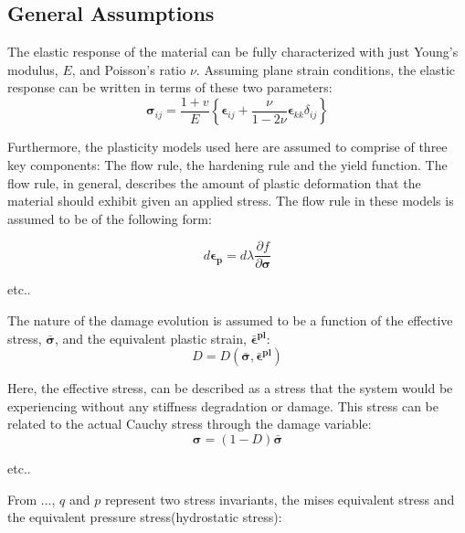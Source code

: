\subsection{General Assumptions}
The elastic response of the material can be fully characterized with just Young's modulus, $E$, and Poisson's ratio $\nu$. Assuming plane strain conditions, the elastic response can be written in terms of these two parameters:
\begin{equation}
\boldsymbol{\sigma}_{ij}=\frac{1+v}{E}\left\{\boldsymbol{\epsilon}_{ij}+\frac{\nu}{1-2\nu}\boldsymbol{\epsilon}_{kk}\delta_{ij}\right\}
\label{eqn:const8a}
\end{equation}

Furthermore, the plasticity models used here are assumed to comprise of three key components: The flow rule, the hardening rule and the yield function. The flow rule, in general, describes the amount of plastic deformation that the material should exhibit given an applied stress. The flow rule in these models is assumed to be of the following form:

\begin{equation}
d\boldsymbol{\epsilon_p}=d\lambda \frac{\partial f}{\partial \boldsymbol{\sigma}}
\label{eqn:const8b}
\end{equation}


etc..

The nature of the damage evolution is assumed to be a function of the effective stress, $\boldsymbol{\bar{\sigma}}$, and the equivalent plastic strain, $\boldsymbol{\bar{\epsilon}^{pl}}$:
\begin{equation}
D=D(\boldsymbol{\bar{\sigma}},\boldsymbol{\bar{\epsilon}^{pl}})\label{eqn:const8}
\end{equation}



Here, the effective stress,  can be described as a stress that the system would be experiencing without any stiffness degradation or damage. This stress can be related to the actual Cauchy stress through the damage variable: 
\begin{equation}
\boldsymbol{\sigma}=(1-D)\boldsymbol{\bar{\sigma}}\label{eqn:const7}
\end{equation}

etc..

From ..., $q$ and $p$ represent two stress invariants, the mises
equivalent stress and the equivalent pressure stress(hydrostatic stress):

